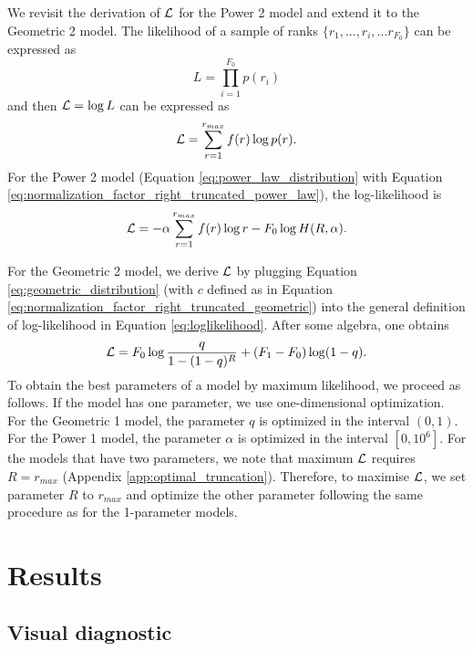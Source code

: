 \documentclass[USenglish]{article}
\newcommand{\loglikelihood}{{\cal L}}
\begin{document}
We revisit the derivation of $\loglikelihood$ for the Power 2 model
\iftoggle{anonymous}{{\bf(author, year)}}
{\citep{Baixeries2012c}} 
and extend it to the Geometric 2 model. 
The likelihood of a sample of ranks $\{r_1,...,r_i,...r_{F_0}\}$ can be expressed as
\begin{equation}
L = \prod_{i=1}^{F_0} p(r_i)
\label{eq:likelihood}
\end{equation} 
and then $\loglikelihood = \log L$ can be expressed as 
\begin{equation}
\loglikelihood = \sum_{r=1}^{r_{max}} f(r) \log p(r).
\label{eq:loglikelihood}
\end{equation}
For the Power 2 model (Equation \ref{eq:power_law_distribution} with Equation \ref{eq:normalization_factor_right_truncated_power_law}), the log-likelihood is
\begin{equation}
\loglikelihood = - \alpha \sum_{r=1}^{r_{max}}f(r) \log r - F_0 \log H(R, \alpha).
\label{eq:loglikelihood_power_2}
\end{equation}

For the Geometric 2 model, we derive $\loglikelihood$ by plugging Equation \ref{eq:geometric_distribution} (with $c$ defined as in Equation \ref{eq:normalization_factor_right_truncated_geometric}) into the general definition of log-likelihood in Equation \ref{eq:loglikelihood}. After some algebra, one obtains
\begin{equation}
\loglikelihood = F_0 \log \frac{q}{1 - (1 - q)^R} + (F_1 - F_0)\log(1-q).
\label{eq:loglikelihood_geometric_2}
\end{equation}
To obtain the best parameters of a model by maximum likelihood, we proceed as follows. If the model has one parameter, we use one-dimensional optimization. For the Geometric 1 model, the parameter $q$ is optimized in the interval $(0,1)$. For the Power 1 model, the parameter $\alpha$ is optimized in the interval $[0,10^6]$. For the models that have two parameters, we note that maximum $\loglikelihood$ requires $R = r_{max}$ (Appendix \ref{app:optimal_truncation}). Therefore, to maximise $\loglikelihood$, we set parameter $R$ to $r_{max}$ and optimize the other parameter following the same procedure as for the 1-parameter models.

\section{Results}

\subsection{Visual diagnostic}
\end{document}
